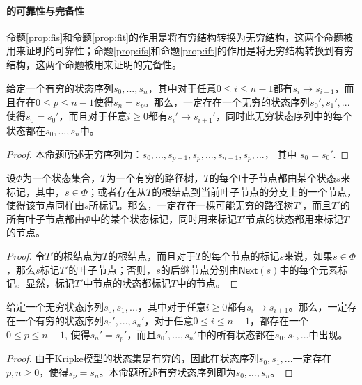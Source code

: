 \paragraph{\SCTL{}的可靠性与完备性}\label{sound:complete}
命题\ref{prop:fis}和命题\ref{prop:fit}的作用是将有穷结构转换为无穷结构，这两个命题被用来证明\SCTL{}的可靠性；命题\ref{prop:ifs}和命题\ref{prop:ift}的作用是将无穷结构转换到有穷结构，这两个命题被用来证明\SCTL{}的完备性。

\begin{proposition} [有穷状态序列到无穷状态序列]\label{prop:fis}
	给定一个有穷的状态序列$s_0,...,s_n$，其中对于任意$0\le i\le n-1$都有$s_i\longrightarrow s_{i+1}$，而且存在$0\le p \le n-1$使得$s_n=s_p$。那么，一定存在一个无穷的状态序列$s_0',s_1',...$使得$s_0 = s_0'$，而且对于任意$i\ge 0$都有$s_i'\longrightarrow
	s_{i+1}'$，同时此无穷状态序列中的每个状态都在$s_0,...,s_n$中。
\end{proposition}
\begin{proof}
	本命题所述无穷序列为：$s_0,...,s_{p-1},s_p,...,s_{n-1},s_p,...$， 其中 $s_0 = s_0'$.
\end{proof}

\begin{proposition}[有穷路径树到无穷路径树]\label{prop:fit}
	设$\Phi$为一个状态集合，$T$为一个有穷的路径树，$T$的每个叶子节点都由某个状态$s$来标记，其中，$s\in \Phi$；或者存在从$T$的根结点到当前叶子节点的分支上的一个节点，使得该节点同样由$s$所标记。那么，一定存在一棵可能无穷的路径树$T'$，而且$T'$的所有叶子节点都由$\Phi$中的某个状态标记，同时用来标记$T'$节点的状态都用来标记$T$的节点。
\end{proposition}
\begin{proof}
	令$T'$的根结点为$T$的根结点，而且对于$T$的每个节点的标记$s$来说，如果$s\in\Phi$，那么$s$标记$T'$的叶子节点；否则，$s$的后继节点分别由$\mathsf{Next}(s)$中的每个元素标记。显然，标记$T'$中节点的状态都标记$T$中的节点。
\end{proof}


\begin{proposition} [无穷状态序列到有穷状态序列]\label{prop:ifs}
	给定一个无穷状态序列$s_0,s_1,...$，其中对于任意$i\ge 0$都有$s_i\longrightarrow s_{i+1}$。那么，一定存在一个有穷的状态序列$s_0',...,s_n'$，对于任意$0\le i\le n-1$，都存在一个$0\le p\le n-1$, 使得$s_n'=s_p'$，而且$s_0',...,s_n'$中的所有状态都在$s_0,s_1,...$中出现。
\end{proposition}
\begin{proof}
	由于Kripke模型的状态集是有穷的，因此在状态序列$s_0,s_1,...$一定存在$p, n\ge 0$，使得$s_p=s_n$。本命题所述有穷状态序列即为$s_0,...,s_n$。
\end{proof}

